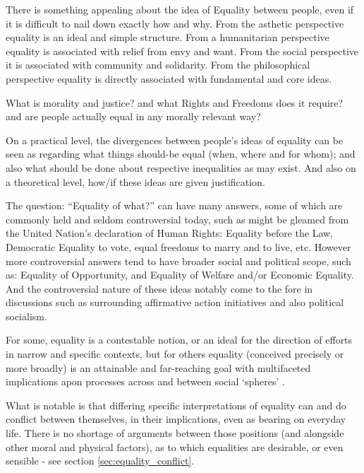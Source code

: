 \documentclass{article}
\begin{document}
There is something appealing about the idea of Equality between people, even if it is difficult to nail down exactly how and why.
From the asthetic perspective equality is an ideal and simple structure. From a humanitarian perspective equality is associated with relief from envy and want. From the social perspective it is associated with community and solidarity. From the philosophical perspective equality is directly associated with fundamental and core ideas.

What is morality and justice? and what Rights and Freedoms does it require? and are people actually equal in any morally relevant way?

On a practical level, the divergences between people's ideas of equality can be seen as regarding what things should-be equal (when, where and for whom); and also what should be done about respective inequalities as may exist.
And also on a theoretical level, how/if these ideas are given justification.

The question: ``Equality of what?'' can have many answers, some of which are commonly held and seldom controversial today, such as might be gleamed from the United Nation's declaration of Human Rights: Equality before the Law, Democratic Equality to vote, equal freedoms to marry and to live, etc.\cite{udhr}
However more controversial answers tend to have broader social and political scope, such as: Equality of Opportunity, and Equality of Welfare and/or Economic Equality. And the controversial nature of these ideas notably come to the fore in discussions such as surrounding affirmative action initiatives and also political socialism.

For some, equality is a contestable notion, or an ideal for the direction of efforts in narrow and specific contexts, but for others equality (conceived precisely or more broadly) is an attainable and far-reaching goal with multifaceted implications apon processes across and between social `spheres' \cite{walzer2008spheres,millerandwalzer,baker1992arguing}.

What is notable is that differing specific interpretations of equality can and do conflict between themselves, in their implications, even as bearing on everyday life. There is no shortage of arguments between those positions (and alongside other moral and physical factors), as to which equalities are desirable, or even sensible - see section \ref{sec:equality_conflict}.
\end{document}
